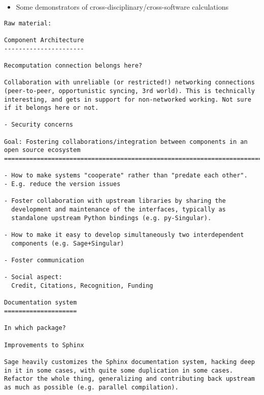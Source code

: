 \begin{Workpackage}{\thewpno}
\begin{WPDeliverables}
\begin{itemize}
    \item Some demonstrators of cross-disciplinary/cross-software calculations

    \end{itemize}
  \end{WPDeliverables}
\begin{verbatim}
Raw material:

Component Architecture
----------------------

Recomputation connection belongs here?

Collaboration with unreliable (or restricted!) networking connections
(peer-to-peer, opportunistic syncing, 3rd world). This is technically
interesting, and gets in support for non-networked working. Not sure
if it belongs here or not.

- Security concerns

Goal: Fostering collaborations/integration between components in an open source ecosystem
=============================================================================

- How to make systems "cooperate" rather than "predate each other".
- E.g. reduce the version issues

- Foster collaboration with upstream libraries by sharing the
  development and maintenance of the interfaces, typically as
  standalone upstream Python bindings (e.g. py-Singular).

- How to make it easy to develop simultaneously two interdependent
  components (e.g. Sage+Singular)

- Foster communication

- Social aspect:
  Credit, Citations, Recognition, Funding

Documentation system
====================

In which package?

Improvements to Sphinx

Sage heavily customizes the Sphinx documentation system, hacking deep
in it in some cases, with quite some duplication in some cases.
Refactor the whole thing, generalizing and contributing back upstream
as much as possible (e.g. parallel compilation).
\end{verbatim}

\end{Workpackage}

